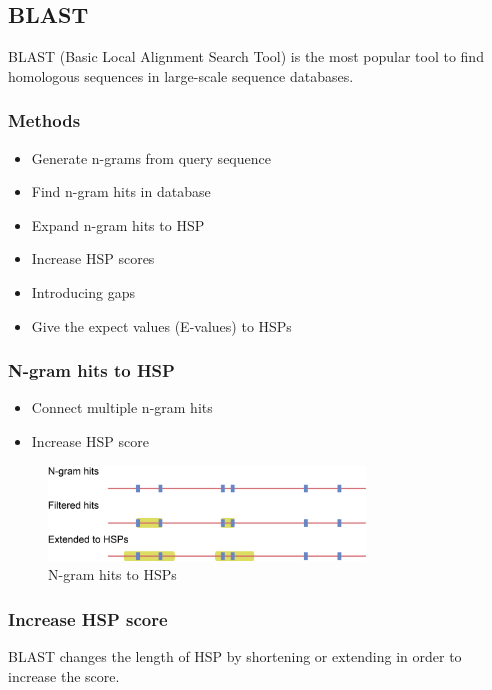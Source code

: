 %
% 

%
%
\subsection{BLAST}
BLAST (Basic Local Alignment Search Tool) is the most popular tool to find homologous sequences in large-scale sequence databases.

%
%
\subsubsection*{Methods} 
\begin{itemize}
\item Generate n-grams from query sequence
\item Find n-gram hits in database
\item Expand n-gram hits to HSP
\item Increase HSP scores
\item Introducing gaps
\item Give the expect values (E-values) to HSPs
\end{itemize}

%
%
\subsubsection*{N-gram hits to HSP} 
\begin{itemize}
\item Connect multiple n-gram hits 
\item Increase HSP score
\end{itemize}

\begin{figure}[H]
  \centering
      \includegraphics[width=0.75\textwidth]{fig05/extend_hsps.png}
  \caption{N-gram hits to HSPs}
\end{figure}

%
%
\subsubsection*{Increase HSP score} 
BLAST changes the length of HSP by shortening or extending in order to increase the score.

